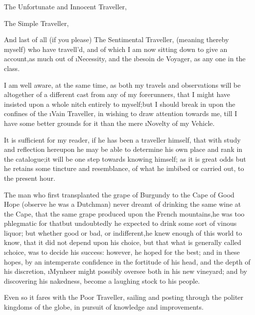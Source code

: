\documentclass[twoside]{article}
\begin{document}
  The Unfortunate and Innocent Traveller,

  The Simple Traveller,

And last of all (if you please) The Sentimental Traveller, (meaning
thereby myself) who have travell’d, and of which I am now sitting down to
give an account,\tsk as much out of \i{Necessity}, and the \i{besoin de Voyager},
as any one in the class.

I am well aware, at the same time, as both my travels and observations
will be altogether of a different cast from any of my forerunners, that I
might have insisted upon a whole nitch entirely to myself;\tsk but I should
break in upon the confines of the \i{Vain} Traveller, in wishing to draw
attention towards me, till I have some better grounds for it than the
mere \i{Novelty of my Vehicle}.

It is sufficient for my reader, if he has been a traveller himself, that
with study and reflection hereupon he may be able to determine his own
place and rank in the catalogue;\tsk it will be one step towards knowing
himself; as it is great odds but he retains some tincture and
resemblance, of what he imbibed or carried out, to the present hour.

The man who first transplanted the grape of Burgundy to the Cape of Good
Hope (observe he was a Dutchman) never dreamt of drinking the same wine
at the Cape, that the same grape produced upon the French mountains,\tsk he
was too phlegmatic for that\tsk but undoubtedly he expected to drink some
sort of vinous liquor; but whether good or bad, or indifferent,\tsk he knew
enough of this world to know, that it did not depend upon his choice, but
that what is generally called \i{choice}, was to decide his success:
however, he hoped for the best; and in these hopes, by an intemperate
confidence in the fortitude of his head, and the depth of his discretion,
\i{Mynheer} might possibly oversee both in his new vineyard; and by
discovering his nakedness, become a laughing stock to his people.

Even so it fares with the Poor Traveller, sailing and posting through the
politer kingdoms of the globe, in pursuit of knowledge and improvements.
\end{document}
